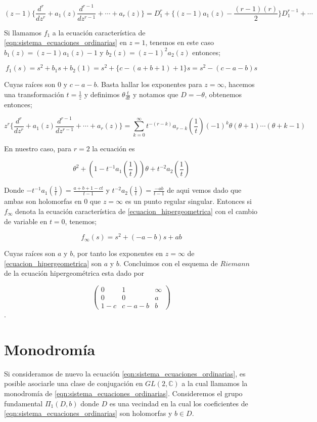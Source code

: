 $$(z-1) \lbrace \frac{d^{r}}{dz^{r}} + a_{1}(z)\frac{d^{r-1}}{dz^{r-1}}+ \cdots + a_{r}(z) \rbrace = D_{1}^{r} + \lbrace (z-1)a_{1}(z) - \frac{(r-1)(r)}{2} \rbrace D_{1}^{r-1} + \cdots $$

Si llamamos $f_{1}$ a la ecuaci\'on caracter\'istica de \ref{eqn:sistema_ecuaciones_ordinarias} en $z=1$, tenemos en este caso $b_{1}(z)= (z-1)a_{1}(z) -1$ y $ b_{2}(z) = (z-1)^{2}a_{2}(z)$ entonces;

$$ f_{1}(s) = s^{2} + b_{1}s + b_{2}(1)= s^{2} + \lbrace c-(a+b+1) +1 \rbrace s = s^{2} - (c-a-b)s $$

Cuyas ra\'ices son $0$ y $c-a-b$. Basta hallar los exponentes para $z= \infty$, hacemos una transformaci\'on $t=\frac{1}{z}$ y definimos $\theta \frac{t}{dt}$ y notamos que $D=- \theta$, obtenemos entonces;

$$z^{r} \lbrace \frac{d^{r}}{dz^{r}} + a_{1}(z) \frac{d^{r-1}}{dz^{r-1}} + \cdots +a_{r}(z) \rbrace = \sum_{k=0}^{\infty} t^{-(r-k)}a_{r-k} (\frac{1}{t})(-1)^{k} \theta (\theta +1) \cdots (\theta + k-1)$$

En nuestro caso, para $r=2$ la ecuaci\'on es

$$\theta^{2} + (1-t^{-1}a_{1}(\frac{1}{t}))\theta + t^{-2}a_{2}(\frac{1}{t}) $$

Donde $-t^{-1}a_{1}(\frac{1}{t}) = \frac{a+b+1-ct}{t-1}$ y $t^{-2}a_{2}(\frac{1}{t})= \frac{-ab}{t-1}$ de aqui vemos dado que ambas son holomorfas en $0$ que $z= \infty$ es un punto regular singular. Entonces si $f_{\infty}$ denota la ecuaci\'on caracter\'istica de \ref{ecuacion_hipergeometrica} con el cambio de variable en $t=0$, tenemos;

$$ f_{\infty}(s) = s^{2} + (-a-b)s +ab$$

Cuyas ra\'ices son $a$ y $b$, por tanto los exponentes en $z=\infty $ de \ref{ecuacion_hipergeometrica}  son $a$ y $b$. Concluimos con el esquema de $Riemann$ de la ecuaci\'on hipergeom\'etrica  esta dado por

\[ \left( \begin{array}{ccc}
0 & 1 & \infty \\
0 & 0 & a \\
1-c &c-a-b & b  \end{array} \right)\].

\section{Monodrom\'ia}

Si consideramos de nuevo la ecuaci\'on \ref{eqn:sistema_ecuaciones_ordinarias}, es posible asociarle una clase de conjugaci\'on en $GL(2,\mathbb{C})$ a la cual llamamos la monodrom\'ia de \ref{eqn:sistema_ecuaciones_ordinarias}. Consideremos el grupo fundamental $\Pi_{1} (D,b)$ donde $D$ es una vecindad en la cual los coeficientes de \ref{eqn:sistema_ecuaciones_ordinarias} son holomorfas y $b \in D$.\\

